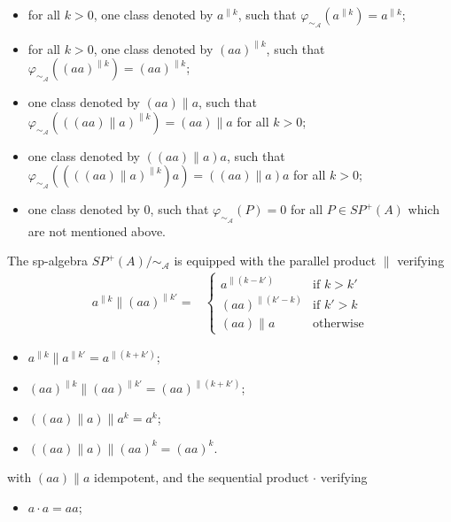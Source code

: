 \documentclass{CSML}
\begin{document}
\begin{exa}
  \begin{itemize}
  \item for all $k>0$, one class denoted by $a^{\parallel k}$, such that $\varphi_{\sim_{\mathcal{A}}}(a^{\parallel k})=a^{\parallel k}$;
  \item for all $k>0$, one class denoted by $(aa)^{\parallel k}$, such that $\varphi_{\sim_{\mathcal{A}}}((aa)^{\parallel k})=(aa)^{\parallel k}$;
  \item one class denoted by $(aa)\parallel a$, such that $\varphi_{\sim_{\mathcal{A}}}(((aa)\parallel a)^{\parallel k})=(aa)\parallel a$ for all $k>0$;
  \item one class denoted by $((aa)\parallel a)a$, such that $\varphi_{\sim_{\mathcal{A}}}((((aa)\parallel a)^{\parallel k})a)=((aa)\parallel a)a$ for all $k>0$;
  \item one class denoted by $0$, such that $\varphi_{\sim_{\mathcal{A}}}(P)=0$ for all $P\in SP^+(A)$ which are not mentioned above.
  \end{itemize}
  The sp-algebra $SP^+(A)/\mathord\sim_\mathcal{A}$ is equipped with the parallel product $\parallel$ verifying
  \begin{align*}
    a^{\parallel k}\parallel (aa)^{\parallel k'} =&
    \begin{cases}
      a^{\parallel (k-k')} & \text{if }k>k'\\
      (aa)^{\parallel (k'-k)} & \text{if }k'>k\\
      (aa)\parallel a & \text{otherwise}
    \end{cases}
    \end{align*}
    \begin{multicols}{2}
      \begin{itemize}
    \item $a^{\parallel k}\parallel a^{\parallel k'} = a^{\parallel (k+k')}$;
    \item $(aa)^{\parallel k}\parallel (aa)^{\parallel k'} = (aa)^{\parallel (k+k')}$;
    \item $((aa)\parallel a)\parallel a^k = a^k$;
    \item $((aa)\parallel a)\parallel (aa)^k = (aa)^k$.
  \end{itemize}
  \end{multicols}
  \noindent with $(aa)\parallel a$ idempotent, and the sequential product $\cdot$ verifying
  \begin{multicols}{2}
  \begin{itemize}
    \item $a\cdot a = aa$;

\end{itemize}
\end{multicols}
\end{exa}
\end{document}
